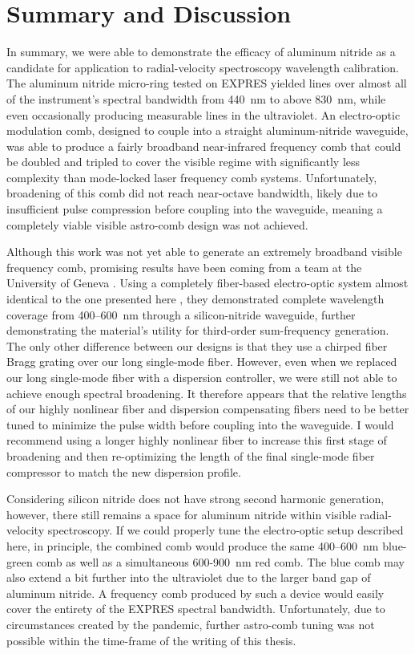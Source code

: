 \section{Summary and Discussion}
\label{astro-comb:discussion}

In summary, we were able to demonstrate the efficacy of aluminum nitride as a candidate for application to radial-velocity spectroscopy wavelength calibration. The aluminum nitride micro-ring tested on EXPRES yielded lines over almost all of the instrument's spectral bandwidth from 440~\si{\nano\meter} to above 830~\si{\nano\meter}, while even occasionally producing measurable lines in the ultraviolet. An electro-optic modulation comb, designed to couple into a straight aluminum-nitride waveguide, was able to produce a fairly broadband near-infrared frequency comb that could be doubled and tripled to cover the visible regime with significantly less complexity than mode-locked laser frequency comb systems. Unfortunately, broadening of this comb did not reach near-octave bandwidth, likely due to insufficient pulse compression before coupling into the waveguide, meaning a completely viable visible astro-comb design was not achieved.

Although this work was not yet able to generate an extremely broadband visible frequency comb, promising results have been coming from a team at the University of Geneva \citep{obrzud_visible_2019}. Using a completely fiber-based electro-optic system almost identical to the one presented here \citep{obrzud_microphotonic_2019}, they demonstrated complete wavelength coverage from 400--600~\si{\nano\meter} through a silicon-nitride waveguide, further demonstrating the material's utility for third-order sum-frequency generation. The only other difference between our designs is that they use a chirped fiber Bragg grating over our long single-mode fiber. However, even when we replaced our long single-mode fiber with a dispersion controller, we were still not able to achieve enough spectral broadening. It therefore appears that the relative lengths of our highly nonlinear fiber and dispersion compensating fibers need to be better tuned to minimize the pulse width before coupling into the waveguide. I would recommend using a longer highly nonlinear fiber to increase this first stage of broadening and then re-optimizing the length of the final single-mode fiber compressor to match the new dispersion profile.

Considering silicon nitride does not have strong second harmonic generation, however, there still remains a space for aluminum nitride within visible radial-velocity spectroscopy. If we could properly tune the electro-optic setup described here, in principle, the combined comb would produce the same 400--600~\si{\nano\meter} blue-green comb as well as a simultaneous 600-900~\si{\nano\meter} red comb. The blue comb may also extend a bit further into the ultraviolet due to the larger band gap of aluminum nitride. A frequency comb produced by such a device would easily cover the entirety of the EXPRES spectral bandwidth. Unfortunately, due to circumstances created by the pandemic, further astro-comb tuning was not possible within the time-frame of the writing of this thesis.


